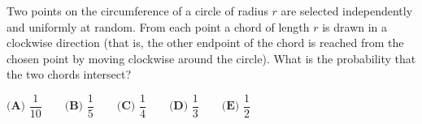 Two points on the circumference of a circle of radius $r$ are selected independently and uniformly at random. From each point a chord of length $r$ is drawn in a clockwise direction (that is, the other endpoint of the chord is reached from the chosen point by moving clockwise around the circle). What is the probability that the two chords intersect?

$\textbf{(A) } \dfrac{1}{10}\qquad\textbf{(B) } \dfrac{1}{5}\qquad\textbf{(C) } \dfrac{1}{4}\qquad\textbf{(D) } \dfrac{1}{3}\qquad\textbf{(E) } \dfrac{1}{2}$
